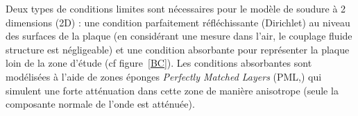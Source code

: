 Deux types de conditions limites sont nécessaires pour le modèle de soudure à 2 dimensions (2D) : une condition parfaitement réfléchissante (Dirichlet) au niveau des surfaces de la plaque (en considérant une mesure dans l'air, le couplage fluide structure est négligeable) et une condition absorbante pour représenter la plaque loin de la zone d'étude (cf figure~\ref{BC}). Les conditions absorbantes sont modélisées à l'aide de zones éponges \emph{Perfectly Matched Layers} (PML,\cite{berenger}) qui simulent une forte atténuation dans cette zone de manière anisotrope (seule la composante normale de l'onde est atténuée).\\

\begin{figure}[!h]
	\centering
\end{figure}
